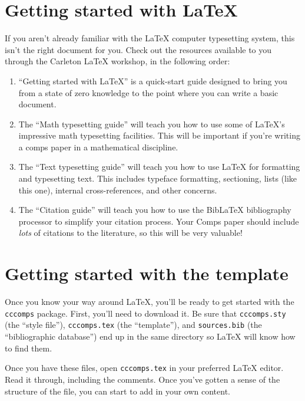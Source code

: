 \documentclass[twoside]{memoir}
\newcommand{\code}[1]{\texttt{#1}}
\begin{document}
\section{Getting started with \LaTeX{}}
\label{s:gettingstarted}
If you aren't already familiar with the \LaTeX{} computer typesetting system, this isn't the right document for you.
Check out the resources available to you through the Carleton \LaTeX{} workshop, in the following order:
\begin{enumerate}
\item
  \enquote{Getting started with \LaTeX{}} is a quick-start guide designed to bring you from a state of zero knowledge to the point where you can write a basic document.

\item
  The \enquote{Math typesetting guide} will teach you how to use some of \LaTeX{}'s impressive math typesetting facilities.
  This will be important if you're writing a comps paper in a mathematical discipline.

\item
  The \enquote{Text typesetting guide} will teach you how to use \LaTeX{} for formatting and typesetting text.
  This includes typeface formatting, sectioning, lists (like this one), internal cross-references, and other concerns.

\item
  The \enquote{Citation guide} will teach you how to use the Bib\LaTeX{} bibliography processor to simplify your citation process.
  Your Comps paper should include \emph{lots} of citations to the literature, so this will be very valuable!
\end{enumerate}

\section{Getting started with the template}
\label{s:template}
Once you know your way around \LaTeX{}, you'll be ready to get started with the \code{cccomps} package.
First, you'll need to download it.
Be sure that \code{cccomps.sty} (the \enquote{style file}), \code{cccomps.tex} (the \enquote{template}), and \code{sources.bib} (the \enquote{bibliographic database}) end up in the same directory so \LaTeX{} will know how to find them.

Once you have these files, open \code{cccomps.tex} in your preferred \LaTeX{} editor.
Read it through, including the comments.
Once you've gotten a sense of the structure of the file, you can start to add in your own content.
\end{document}
